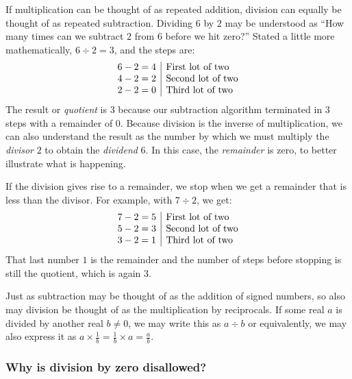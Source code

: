 \documentclass[
  a4paper,
]{article}
\begin{document}
If multiplication can be thought of as repeated addition, division can
equally be thought of as repeated subtraction. Dividing \(6\) by \(2\)
may be understood as ``How many times can we subtract \(2\) from \(6\)
before we hit zero?'' Stated a little more mathematically,
\(6 \div 2 = 3\), and the steps are: \[
\begin{array}{r | l}
6 - 2 = 4 & \mbox{First lot of two}\\
4 - 2 = 2 & \mbox{Second lot of two}\\
2 - 2 = 0 & \mbox{Third lot of two}\\
\end{array}
\] The result or \emph{quotient} is \(3\) because our subtraction
algorithm terminated in \(3\) steps with a remainder of \(0\). Because
division is the inverse of multiplication, we can also understand the
result as the number by which we must multiply the \emph{divisor} \(2\)
to obtain the \emph{dividend} \(6\). In this case, the \emph{remainder}
is zero, to better illustrate what is happening.

If the division gives rise to a remainder, we stop when we get a
remainder that is less than the divisor. For example, with \(7 \div 2\),
we get: \[
\begin{array}{r | l}
7 - 2 = 5 & \mbox{First lot of two}\\
5 - 2 = 3 & \mbox{Second lot of two}\\
3 - 2 = 1 & \mbox{Third lot of two}\\
\end{array}
\] That last number \(1\) is the remainder and the number of steps
before stopping is still the quotient, which is again \(3\).

Just as subtraction may be thought of as the addition of signed numbers,
so also may division be thought of as the multiplication by reciprocals.
If some real \(a\) is divided by another real \(b \ne 0\), we may write
this as \(a \div b\) or equivalently, we may also express it as
\(a \times \frac{1}{b} = \frac{1}{b} \times a = \frac{a}{b}\).

\subsubsection{Why is division by zero
disallowed?}\label{why-is-division-by-zero-disallowed}
\end{document}
